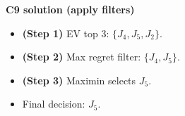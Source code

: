\begin{ExamProblems}
		\textbf{C9 solution (apply filters)}\par
		\begin{itemize}
			\item \textbf{(Step 1)} EV top 3: $\{J_4,J_5,J_2\}$.
			\item \textbf{(Step 2)} Max regret filter: $\{J_4,J_5\}$.
			\item \textbf{(Step 3)} Maximin selects $J_5$.
			\item Final decision: $J_5$.
		\end{itemize}
		
		\end{ExamProblems}

